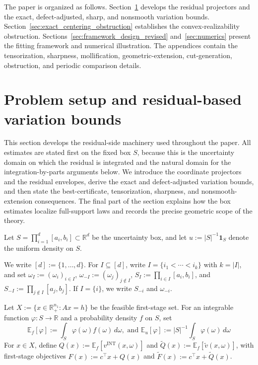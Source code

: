 \documentclass[11pt,letterpaper]{article}
\theoremstyle{definition}
\theoremstyle{remark}
\newcommand{\INT}{\mathrm{INT}}
\begin{document}
The paper is organized as follows. Section~\ref{sec:problem_setup} develops the residual projectors and the exact,
defect-adjusted, sharp, and nonsmooth variation bounds.
Section~\ref{sec:exact_centering_obstruction} establishes the
convex-realizability obstruction. Sections~\ref{sec:framework_design_revised}
and~\ref{sec:numerics} present the fitting framework and numerical
illustration. The appendices contain the tensorization, sharpness,
mollification, geometric-extension, cut-generation, obstruction, and periodic
comparison details.




















\section{Problem setup and residual-based variation bounds}
\label{sec:problem_setup}
 
This section develops the residual-side machinery used throughout the paper.
All estimates are stated first on the fixed box $S$, because this is the
uncertainty domain on which the residual is integrated and the natural domain
for the integration-by-parts arguments below. We introduce the coordinate
projectors and the residual envelopes, derive the exact and defect-adjusted
variation bounds, and then state the best-certificate, tensorization,
sharpness, and nonsmooth-extension consequences. The final part of the section
explains how the box estimates localize full-support laws and records the
precise geometric scope of the theory.

Let $S=\prod_{i=1}^d[a_i,b_i]\subset\mathbb R^d$ be the uncertainty box, and let
$u:=|S|^{-1}\mathbf 1_S$ denote the uniform density on $S$. 

We write
$[d]:=\{1,\ldots,d\}$. For $I\subseteq[d]$, write
$I=\{i_1<\cdots<i_k\}$ with $k=|I|$, and set
$\omega_I:=(\omega_i)_{i\in I}$, $\omega_{-I}:=(\omega_j)_{j\notin I}$,
$S_I:=\prod_{i\in I}[a_i,b_i]$, and
$S_{-I}:=\prod_{j\notin I}[a_j,b_j]$. If $I=\{i\}$, we write
$S_{-i}$ and $\omega_{-i}$.

Let $X:=\{x\in\mathbb R^{n_1}_+:Ax=h\}$ be the feasible first-stage set. For an
integrable function $\varphi:S\to\mathbb R$ and a probability density $f$ on
$S$, set
$$\mathbb E_f[\varphi]:=\int_S\varphi(\omega)f(\omega)\,d\omega, \text{ and } \mathbb E_u[\varphi]:=|S|^{-1}\int_S\varphi(\omega)\,d\omega$$ 
For $x\in X$,
define
$Q(x):=\mathbb E_f[v^{\INT}(x,\omega)]$ and
$\widetilde Q(x):=\mathbb E_f[\widetilde v(x,\omega)]$, with first-stage
objectives $F(x):=c^\top x+Q(x)$ and
$\widetilde F(x):=c^\top x+\widetilde Q(x)$.
\end{document}
